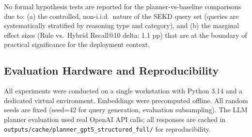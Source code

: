 No formal hypothesis tests are reported for the planner-vs-baseline comparisons due to: (a) the controlled, non-i.i.d.\ nature of the SEKD query set (queries are systematically stratified by reasoning type and category), and (b) the marginal effect sizes (Rule vs.\ Hybrid Recall@10 delta: 1.1 pp) that are at the boundary of practical significance for the deployment context.

\subsection{Evaluation Hardware and Reproducibility}

All experiments were conducted on a single workstation with Python 3.14 and a dedicated virtual environment. Embeddings were precomputed offline. All random seeds are fixed (seed=42 for query generation, evaluation subsampling). The LLM planner evaluation used real OpenAI API calls; all responses are cached in \texttt{outputs/cache/planner\_gpt5\_structured\_full/} for reproducibility.

